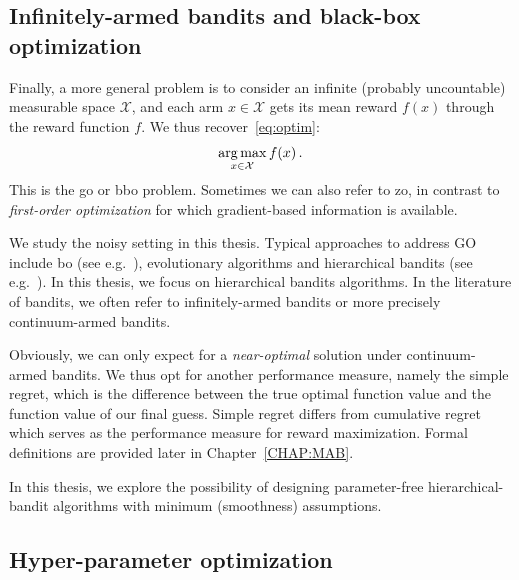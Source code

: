 \subsection{Infinitely-armed bandits and black-box optimization}\label{sec:intro.mab.bbo}

Finally, a more general problem is to consider an infinite (probably uncountable) measurable space $\mathcal{X}$, and each arm $x\in\mathcal{X}$ gets its mean reward $f(x)$ through the reward function $f$. We thus recover~\eqref{eq:optim}:
\[
    \operatorname*{arg\,max}_{x\in\mathcal{X}} f(x)\,.
\]
This is the \gls{go} or \gls{bbo} problem. Sometimes we can also refer to \gls{zo}, in contrast to \emph{first-order optimization} for which gradient-based information is available.

We study the noisy setting in this thesis. Typical approaches to address GO include \gls{bo} (see e.g.~\citealt{brochu2010bayesian}), evolutionary algorithms and hierarchical bandits (see e.g.~\citealt{bubeck2010x}). In this thesis, we focus on hierarchical bandits algorithms. In the literature of bandits, we often refer to \gls{infinitely-armed bandits} or more precisely \gls{continuum-armed bandits}.

Obviously, we can only expect for a \emph{near-optimal} solution under continuum-armed bandits. We thus opt for another performance measure, namely the \gls{simple regret}, which is the difference between the true optimal function value and the function value of our final guess. Simple regret differs from \gls{cumulative regret} which serves as the performance measure for reward maximization. Formal definitions are provided later in Chapter~\ref{CHAP:MAB}.

In this thesis, we explore the possibility of designing parameter-free hierarchical-bandit algorithms with minimum (smoothness) assumptions.


\subsection{Hyper-parameter optimization}\label{sec:intro.mab.hpo}

